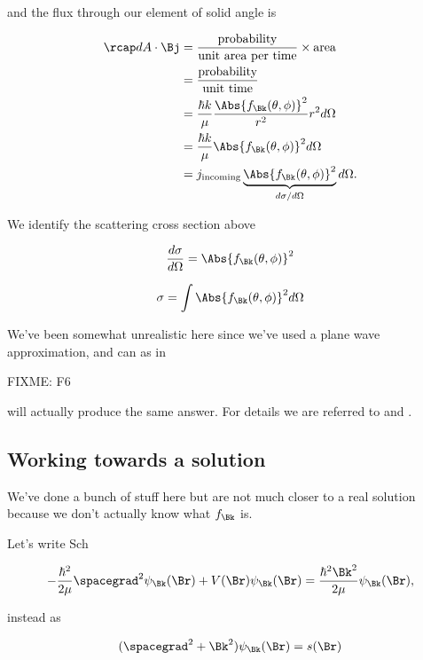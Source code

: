 and the flux through our element of solid angle is

\begin{align*}
\rcap dA \cdot \Bj
&=
\frac{\text{probability}}{\text{unit area per time}} \times \text{area}  \\
&= \frac{\text{probability}}{\text{unit time}} \\
&=
\frac{\hbar k}{\mu} \frac{\Abs{f_\Bk(\theta, \phi)}^2}{r^2} r^2 d\Omega \\
&=
\frac{\hbar k }{\mu}
\Abs{f_\Bk(\theta, \phi)}^2 d\Omega \\
&=
j_{\text{incoming}}
\underbrace{\Abs{f_\Bk(\theta, \phi)}^2}_{d\sigma/d\Omega} d\Omega.
\end{align*}

We identify the scattering cross section above

\begin{equation}\label{eqn:qmTwoL24:n}
\frac{d\sigma}{d\Omega}
=
\Abs{f_\Bk(\theta, \phi)}^2
\end{equation}

\begin{equation}\label{eqn:qmTwoL24:n}
\sigma = \int \Abs{f_\Bk(\theta, \phi)}^2 d\Omega
\end{equation}

We've been somewhat unrealistic here since we've used a plane wave approximation, and can as in

FIXME: F6

will actually produce the same answer.  For details we are referred to \cite{messiah1999quantum} and \cite{taylor1972scattering}.

\subsection{Working towards a solution}

We've done a bunch of stuff here but are not much closer to a real solution because we don't actually know what $f_\Bk$ is.

Let's write Sch

\begin{equation}\label{eqn:qmTwoL24:n}
-\frac{\hbar^2}{2\mu} \spacegrad^2
\psi_\Bk(\Br)
+ V(\Br)
\psi_\Bk(\Br)
=
\frac{\hbar^2 \Bk^2}{2 \mu}
\psi_\Bk(\Br),
\end{equation}

instead as

\begin{equation}\label{eqn:qmTwoL24:n}
(\spacegrad^2 + \Bk^2)
\psi_\Bk(\Br)
= s(\Br)
\end{equation}

